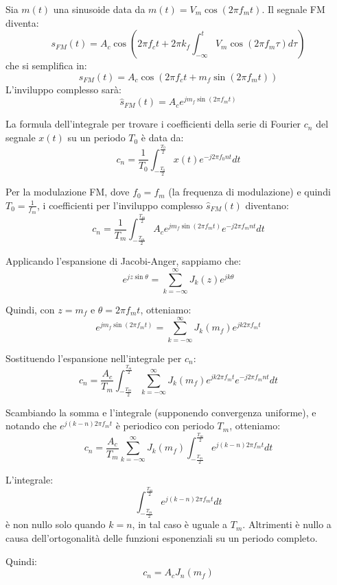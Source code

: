 Sia \( m(t) \) una sinusoide data da \( m(t) = V_m \cos(2\pi f_m t) \). Il segnale FM diventa:
\[
    s_{FM}(t) = A_c \cos \left( 2\pi f_c t + 2\pi k_f \int_{-\infty}^{t} V_m \cos(2\pi f_m \tau) d\tau \right)
\]
che si semplifica in:
\[
    s_{FM}(t) = A_c \cos \left(2\pi f_c t + m_f \sin(2\pi f_m t) \right)
\]
L'inviluppo complesso sarà:
\[
    \hat{s}_{FM}(t) = A_c e^{j m_f \sin(2\pi f_m t)}
\]

La formula dell'integrale per trovare i coefficienti della serie di Fourier \( c_n \) del segnale \( x(t) \) su un periodo \( T_0 \) è data da:
\[ c_n = \frac{1}{T_0} \int_{-\frac{T_0}{2}}^{\frac{T_0}{2}} x(t) e^{-j 2\pi f_0 n t} dt \]

Per la modulazione FM, dove \( f_0 = f_m \) (la frequenza di modulazione) e quindi \( T_0 = \frac{1}{f_m} \), i coefficienti per l'inviluppo complesso \( \hat{s}_{FM}(t) \) diventano:
\[ c_n = \frac{1}{T_m} \int_{-\frac{T_m}{2}}^{\frac{T_m}{2}} A_c e^{j m_f \sin(2\pi f_m t)} e^{-j 2\pi f_m n t} dt \]

Applicando l'espansione di Jacobi-Anger, sappiamo che:
\[ e^{j z \sin \theta} = \sum_{k=-\infty}^\infty J_k(z) e^{j k \theta} \]

Quindi, con \( z = m_f \) e \( \theta = 2\pi f_m t \), otteniamo:
\[ e^{j m_f \sin(2\pi f_m t)} = \sum_{k=-\infty}^\infty J_k(m_f) e^{j k 2\pi f_m t} \]


Sostituendo l'espansione nell'integrale per \( c_n \):
\[ c_n = \frac{A_c}{T_m} \int_{-\frac{T_m}{2}}^{\frac{T_m}{2}} \sum_{k=-\infty}^\infty J_k(m_f) e^{j k 2\pi f_m t} e^{-j 2\pi f_m n t} dt \]

Scambiando la somma e l'integrale (supponendo convergenza uniforme), e notando che \( e^{j (k-n) 2\pi f_m t} \) è periodico con periodo \( T_m \), otteniamo:
\[ c_n = \frac{A_c}{T_m} \sum_{k=-\infty}^\infty J_k(m_f) \int_{-\frac{T_m}{2}}^{\frac{T_m}{2}} e^{j (k-n) 2\pi f_m t} dt \]

L'integrale:
\[ \int_{-\frac{T_m}{2}}^{\frac{T_m}{2}} e^{j (k-n) 2\pi f_m t} dt \]
è non nullo solo quando \( k = n \), in tal caso è uguale a \( T_m \). Altrimenti è nullo a causa dell'ortogonalità delle funzioni esponenziali su un periodo completo.

Quindi:
\[ c_n = A_c J_n(m_f) \]


